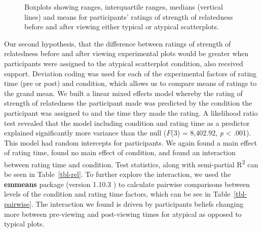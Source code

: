 \documentclass[manuscript,screen,review,anonymous]{acmart}
\begin{document}
\begin{figure}


\caption{\label{fig-abso-descriptives}Boxplots showing ranges,
interquartile ranges, medians (vertical lines) and means for
participants' ratings of strength of relatedness before and after
viewing either typical or atypical scatterplots.}

\end{figure}%

Our second hypothesis, that the difference between ratings of strength
of relatedness before and after viewing experimental plots would be
greater when participants were assigned to the atypical scatterplot
condition, also received support. Deviation coding was used for each of
the experimental factors of rating time (pre or post) and condition,
which allows us to compare means of ratings to the grand mean. We built
a linear mixed effects model whereby the rating of strength of
relatedness the participant made was predicted by the condition the
participant was assigned to and the time they made the rating. A
likelihood ratio test revealed that the model including condition and
rating time as a predictor explained significantly more variance than
the null (\(F\)(3) = 8,402.92, \emph{p} \textless{} .001). This model
had random intercepts for participants. We again found a main effect of
rating time, found no main effect of condition, and found an interaction
between rating time and condition. Test statistics, along with
semi-partial R\textsuperscript{2} can be seen in Table~\ref{tbl-rel}. To
further explore the interaction, we used the \textbf{emmeans} package
(version 1.10.3 \citep{emmeans}) to calculate pairwise comparisons
between levels of the condition and rating time factors, which can be
see in Table~\ref{tbl-pairwise}. The interaction we found is driven by
participants beliefs changing more between pre-viewing and post-viewing
times for atypical as opposed to typical plots.
\end{document}
